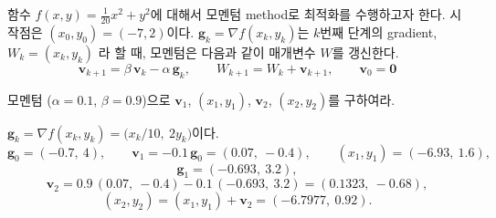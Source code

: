 \documentclass[11pt,a4paper]{article}
\begin{document}
\begin{problems}
\item 함수 $f(x,y)=\frac{1}{20}x^2+y^2$에 대해서 모멘텀 method로 최적화를 수행하고자 한다. 시작점은 $(x_0,y_0)=(-7,2)$이다.
$\bm g_k=\nabla f(x_k,y_k)$는 $k$번째 단계의 gradient, $W_k=(x_k,y_k)$ 라 할 때, 
모멘텀은 다음과 같이 매개변수 $W$를 갱신한다.
\[
\bm v_{k+1}=\beta\,\bm v_k-\alpha\,\bm g_k,
\qquad
W_{k+1}=W_k+\bm v_{k+1},
\qquad
\bm v_0=\bm 0
\]

모멘텀 ($\alpha=0.1$, $\beta=0.9$)으로 $\bm v_1$, $(x_1,y_1)$, $\bm v_2$, $(x_2,y_2)$를 구하여라.

\begin{solbox}
$\bm g_k=\nabla f(x_k,y_k)=\bigl(x_k/10,\ 2y_k\bigr)$이다.
\[
\bm g_0=(-0.7,\ 4),
\qquad
\bm v_1=-0.1\,\bm g_0=(0.07,\ -0.4),
\qquad
(x_1,y_1)=(-6.93,\ 1.6),
\]
\[
\bm g_1=(-0.693,\ 3.2),
\]
\[
\bm v_2=0.9\,(0.07,\ -0.4)-0.1\,(-0.693,\ 3.2)=(0.1323,\ -0.68),
\]
\[
(x_2,y_2)=(x_1,y_1)+\bm v_2=(-6.7977,\ 0.92).
\]

\end{solbox}

\end{problems}
\end{document}
